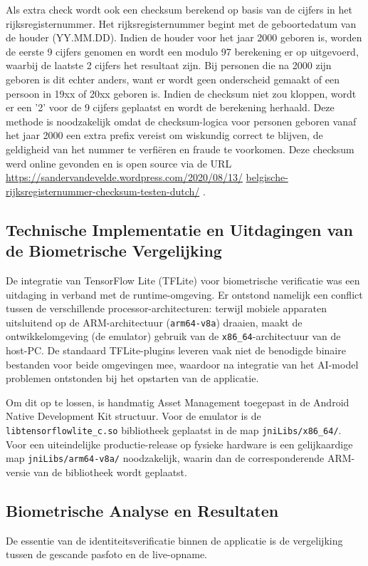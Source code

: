 \begin{itemize}
Als extra check wordt ook een checksum berekend op basis van de cijfers in het rijksregisternummer. Het rijksregisternummer begint met de geboortedatum van de houder (YY.MM.DD). Indien de houder voor het jaar 2000 geboren is, worden de eerste 9 cijfers genomen en wordt een modulo 97 berekening er op uitgevoerd, 
waarbij de laatste 2 cijfers het resultaat zijn.
Bij personen die na 2000 zijn geboren is dit echter anders, want er wordt geen onderscheid gemaakt of een persoon in 19xx of 20xx geboren is. Indien de checksum niet zou kloppen, wordt er een '2' voor de 9 cijfers geplaatst en wordt de berekening herhaald.
Deze methode is noodzakelijk omdat de checksum-logica voor personen geboren vanaf het jaar 2000 een extra prefix vereist om wiskundig correct te blijven, de geldigheid van het nummer te verfiëren en fraude te voorkomen. 
Deze checksum werd online gevonden en is open source via de URL \url{https://sandervandevelde.wordpress.com/2020/08/13/} \linebreak
\url{belgische-rijksregisternummer-checksum-testen-dutch/} \autocite{Sandervandevelde2020}.

\subsection{Technische Implementatie en Uitdagingen van de Biometrische Vergelijking}
De integratie van TensorFlow Lite (TFLite) voor biometrische verificatie was een uitdaging in verband met de runtime-omgeving.
Er ontstond namelijk een conflict tussen de verschillende processor-architecturen: terwijl mobiele apparaten uitsluitend op de ARM-architectuur (\texttt{arm64-v8a}) draaien, maakt de ontwikkelomgeving (de emulator) gebruik van de \texttt{x86\_64}-architectuur van de host-PC.
De standaard TFLite-plugins leveren vaak niet de benodigde binaire bestanden voor beide omgevingen mee, waardoor na integratie van het AI-model problemen ontstonden bij het opstarten van de applicatie. 

Om dit op te lossen, is handmatig Asset Management toegepast in de Android Native Development Kit structuur. Voor de emulator is de \texttt{libtensorflowlite\_c.so} bibliotheek geplaatst in de map \texttt{jniLibs/x86\_64/}. 
Voor een uiteindelijke productie-release op fysieke hardware is een gelijkaardige map \texttt{jniLibs/arm64-v8a/} noodzakelijk, waarin dan de corresponderende ARM-\-versie van de bibliotheek wordt geplaatst.

\subsection{Biometrische Analyse en Resultaten}
De essentie van de identiteitsverificatie binnen de applicatie is de vergelijking tussen de gescande pasfoto en de live-opname. 


\end{itemize}
